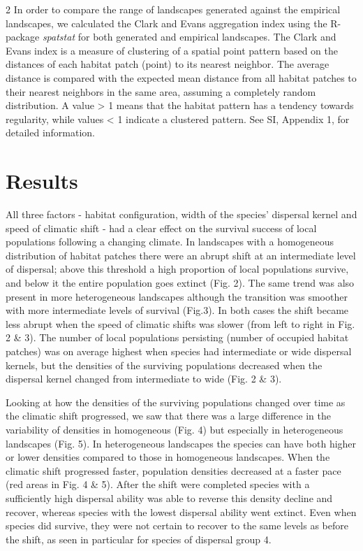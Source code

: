 \documentclass[12pt,pdftex]{article}
\begin{document}
\begin{spacing}{2}
In order to compare the range of landscapes generated against the empirical landscapes, we calculated the Clark and Evans aggregation index \citep{Clark1954} using the R-package {\em spatstat} for both generated and empirical landscapes. The Clark and Evans index is a measure of clustering of a spatial point pattern based on the distances of each habitat patch (point) to its nearest neighbor. The average distance is compared with the expected mean distance from all habitat patches to their nearest neighbors in the same area, assuming a completely random distribution. A value > 1 means that the habitat pattern has a tendency towards regularity, while values < 1 indicate a clustered pattern.  See SI, Appendix 1, for detailed information.


\section*{Results}
All three factors - habitat configuration, width of the species’ dispersal kernel and speed of climatic shift - had a clear effect on the survival success of local populations following a changing climate. In landscapes with a homogeneous distribution of habitat patches there were an abrupt shift at an intermediate level of dispersal; above this threshold a high proportion of local populations survive, and below it the entire population goes extinct (Fig. 2). The same trend was also present in more heterogeneous landscapes although the transition was smoother with more intermediate levels of survival (Fig.3). In both cases the shift became less abrupt when the speed of climatic shifts was slower (from left to right in Fig. 2 \& 3). The number of local populations persisting (number of occupied habitat patches) was on average highest when species had intermediate or wide dispersal kernels, but the densities of the surviving populations decreased when the dispersal kernel changed from intermediate to wide (Fig. 2 \& 3). 


Looking at how the densities of the surviving populations changed over time as the climatic shift progressed, we saw that there was a large difference in the variability of densities in homogeneous (Fig. 4) but especially in heterogeneous landscapes (Fig. 5). In heterogeneous  landscapes the species can have both higher or lower densities compared to those in homogeneous landscapes. When the climatic shift progressed faster, population densities decreased at a faster pace (red areas in Fig. 4 \& 5). After the shift were completed species with a sufficiently high dispersal ability was able to reverse this density decline and recover, whereas species with the lowest dispersal ability went extinct. Even when species did survive, they were not certain to recover to the same levels as before the shift, as seen in particular for species of dispersal group 4. 



\end{spacing}
\end{document}
